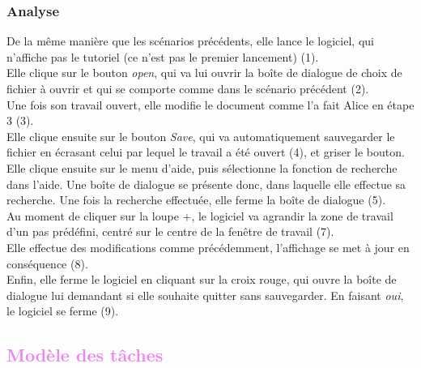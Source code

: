 \documentclass[12pt, a4paper]{article}
\begin{document}
\newpage
\textcolor{NavyBlue}{\subsubsection{Analyse}}

De la même manière que les scénarios précédents, elle lance le logiciel, qui n'affiche pas le tutoriel (ce n'est pas le premier lancement) (1). \\


Elle clique sur le bouton \emph{open}, qui va lui ouvrir la boîte de dialogue de choix de fichier à ouvrir et qui se comporte comme dans le scénario précédent (2).\\


Une fois son travail ouvert, elle modifie le document comme l'a fait Alice en étape 3 (3).\\


Elle clique ensuite sur le bouton \emph{Save}, qui va automatiquement sauvegarder le fichier en écrasant celui par lequel le travail a été ouvert (4), et griser le bouton. \\


Elle clique ensuite sur le menu d'aide, puis sélectionne la fonction de recherche dans l'aide. Une boîte de dialogue se présente donc, dans laquelle elle effectue sa recherche. Une fois la recherche effectuée, elle ferme la boîte de dialogue (5).\\ 


Au moment de cliquer sur la loupe +, le logiciel va agrandir la zone de travail d'un pas prédéfini, centré sur le centre de la fenêtre de travail (7).\\


Elle effectue des modifications comme précédemment, l'affichage se met à jour en conséquence (8).\\


Enfin, elle ferme le logiciel en cliquant sur la croix rouge, qui ouvre la boîte de dialogue lui demandant si elle souhaite quitter sans sauvegarder. En faisant \emph{oui}, le logiciel se ferme (9).
\newpage
\textcolor{Violet}{\section{Modèle des tâches}}
\end{document}
